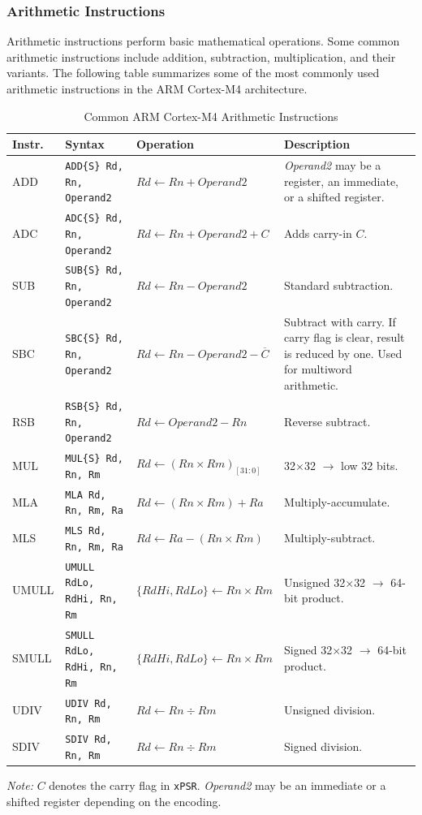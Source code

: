 \subsubsection{Arithmetic Instructions}
Arithmetic instructions perform basic mathematical operations. Some common arithmetic instructions include addition, subtraction, multiplication, and their variants. The following table summarizes some of the most commonly used arithmetic instructions in the ARM Cortex-M4 architecture.
\begin{table}[H]
\centering
\caption{Common ARM Cortex-M4 Arithmetic Instructions}
\small
\begin{tabularx}{\linewidth}{@{}l l l X@{}}
\toprule
\textbf{Instr.} & \textbf{Syntax} & \textbf{Operation} & \textbf{Description} \\
\midrule
ADD  & \texttt{ADD\{S\} Rd, Rn, Operand2}
     & $Rd \leftarrow Rn + Operand2$
     & \emph{Operand2} may be a register, an immediate, or a shifted register. \\
ADC  & \texttt{ADC\{S\} Rd, Rn, Operand2}
     & $Rd \leftarrow Rn + Operand2 + C$
     & Adds carry-in $C$. \\
SUB  & \texttt{SUB\{S\} Rd, Rn, Operand2}
     & $Rd \leftarrow Rn - Operand2$
     & Standard subtraction. \\
SBC  & \texttt{SBC\{S\} Rd, Rn, Operand2}
    & $Rd \leftarrow Rn - Operand2 - \overline{C}$
    & Subtract with carry. If carry flag is clear, result is reduced by one. Used for multiword arithmetic. \\
RSB  & \texttt{RSB\{S\} Rd, Rn, Operand2}
     & $Rd \leftarrow Operand2 - Rn$
     & Reverse subtract. \\
MUL  & \texttt{MUL\{S\} Rd, Rn, Rm}
     & $Rd \leftarrow (Rn \times Rm)_{[31{:}0]}$
     & 32$\times$32 $\rightarrow$ low 32 bits. \\
MLA  & \texttt{MLA Rd, Rn, Rm, Ra}
     & $Rd \leftarrow (Rn \times Rm) + Ra$
     & Multiply-accumulate. \\
MLS  & \texttt{MLS Rd, Rn, Rm, Ra}
     & $Rd \leftarrow Ra - (Rn \times Rm)$
     & Multiply-subtract. \\
UMULL & \texttt{UMULL RdLo, RdHi, Rn, Rm}
      & $\{RdHi,RdLo\} \leftarrow Rn \times Rm$
      & Unsigned 32$\times$32 $\rightarrow$ 64-bit product. \\
SMULL & \texttt{SMULL RdLo, RdHi, Rn, Rm}
      & $\{RdHi,RdLo\} \leftarrow Rn \times Rm$
      & Signed 32$\times$32 $\rightarrow$ 64-bit product. \\
UDIV & \texttt{UDIV Rd, Rn, Rm}
      & $Rd \leftarrow Rn \div Rm$
      & Unsigned division. \\
SDIV & \texttt{SDIV Rd, Rn, Rm}
        & $Rd \leftarrow Rn \div Rm$
        & Signed division. \\

\bottomrule
\end{tabularx}

\vspace{2pt}
\footnotesize\emph{Note:} $C$ denotes the carry flag in \texttt{xPSR}. \emph{Operand2} may be an immediate or a shifted register depending on the encoding.
\end{table}
